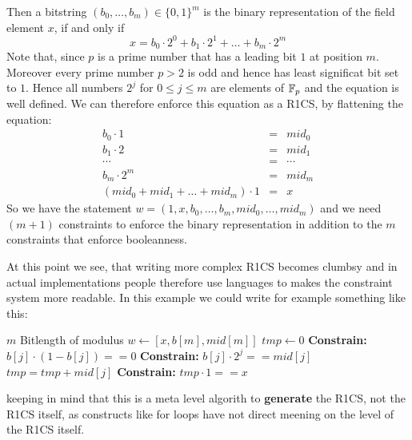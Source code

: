 Then a bitstring $(b_0,\ldots,b_m)\in \{0,1\}^m$ is the binary representation of the field element $x$, if and only if
$$
x = b_0\cdot 2^0 + b_1\cdot 2^1 + \ldots + b_m\cdot 2^m
$$ 
Note that, since $p$ is a prime number that has a leading bit $1$ at position $m$. Moreover every prime number $p>2$ is odd and hence has least significat bit set to $1$. Hence all numbers $2^j$ for $0\leq j \leq m$ are elements of $\mathbb{F}_p$ and the equation is well defined. We can therefore enforce this equation as a R1CS, by flattening the equation: 
$$
\begin{array}{lcl}
b_0 \cdot 1 &=& mid_0\\
b_1 \cdot 2 &=& mid_1\\
\cdots & = & \cdots \\
b_m \cdot 2^m &=& mid_m\\
(mid_0 + mid_1 + \ldots + mid_m)\cdot 1 &=& x
\end{array}
$$
So we have the statement $w = (1, x, b_0,\ldots,b_m, mid_0,\ldots,mid_m)$ and we need $(m+1)$ constraints to enforce the binary representation in addition to the $m$ constraints that enforce booleanness.

At this point we see, that writing more complex R1CS becomes clumbsy and in actual implementations people therefore use languages to makes the constraint system more readable. In this example we could write for example something like this:
\begin{algorithmic}
\Require $m$ Bitlength of modulus
\Statement $w \gets [x,b[m],mid[m]]$
\State $tmp \gets 0$
	\State \textbf{Constrain:} $b[j]\cdot (1-b[j]) == 0$
	\State \textbf{Constrain:} $b[j] \cdot 2^j == mid[j]$
	\State $tmp = tmp + mid[j]$
\EndFor
\State \textbf{Constrain:} $tmp \cdot 1 == x$
\end{algorithmic}

keeping in mind that this is a meta level algorith to \textbf{generate} the R1CS, not the R1CS itself, as constructs like for loops have not direct meening on the level of the R1CS itself.


